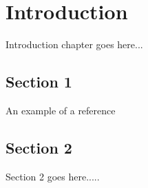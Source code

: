 \documentclass{standalone}
\begin{document}
\chapter{Introduction}
Introduction chapter goes here...

\section{Section 1}
An example of a reference \cite{GraphMap}

\section{Section 2}
Section 2 goes here.....
\end{document}
